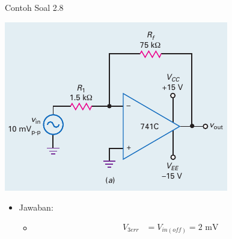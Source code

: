 \begin{frame}[t]{Contoh Soal 2.8}
	\begin{multicols}{2}
		\begin{center}
			\includegraphics[width=\linewidth]{gambar/fig-16.17a}
		\end{center}
		\columnbreak
		\begin{itemize}
			\item Jawaban:
			\begin{itemize}
				\item 
				\begin{align*}
					V_{3err} &= V_{in(off)} = 2 \text{ mV}
				\end{align*}
			\end{itemize}
		\end{itemize}
	\end{multicols}
\end{frame}

